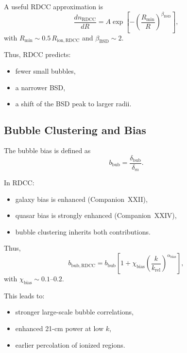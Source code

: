 \documentclass[11pt,a4paper]{article}
\begin{document}
A useful RDCC approximation is
\begin{equation}
\frac{dn_{\mathrm{RDCC}}}{dR}
=
A
\exp\!\left[
-
\left(
\frac{R_{\mathrm{min}}}{R}
\right)^{\beta_{\mathrm{BSD}}}
\right],
\end{equation}
with $R_{\mathrm{min}} \sim 0.5\,R_{\mathrm{ion,RDCC}}$ and $\beta_{\mathrm{BSD}} \sim 2$.

Thus, RDCC predicts:
\begin{itemize}
\item fewer small bubbles,
\item a narrower BSD,
\item a shift of the BSD peak to larger radii.
\end{itemize}

\subsection{Bubble Clustering and Bias}

The bubble bias is defined as
\begin{equation}
b_{\mathrm{bub}}
=
\frac{\delta_{\mathrm{bub}}}{\delta_{m}}.
\end{equation}

In RDCC:
\begin{itemize}
\item galaxy bias is enhanced (Companion~XXII),
\item quasar bias is strongly enhanced (Companion~XXIV),
\item bubble clustering inherits both contributions.
\end{itemize}

Thus,
\begin{equation}
b_{\mathrm{bub,RDCC}}
=
b_{\mathrm{bub}}
\left[
1
+
\chi_{\mathrm{bias}}
\left(
\frac{k}{k_{\mathrm{rel}}}
\right)^{\alpha_{\mathrm{bias}}}
\right],
\end{equation}
with $\chi_{\mathrm{bias}} \sim 0.1$–$0.2$.

This leads to:
\begin{itemize}
\item stronger large-scale bubble correlations,
\item enhanced 21-cm power at low $k$,
\item earlier percolation of ionized regions.
\end{itemize}

\end{document}
